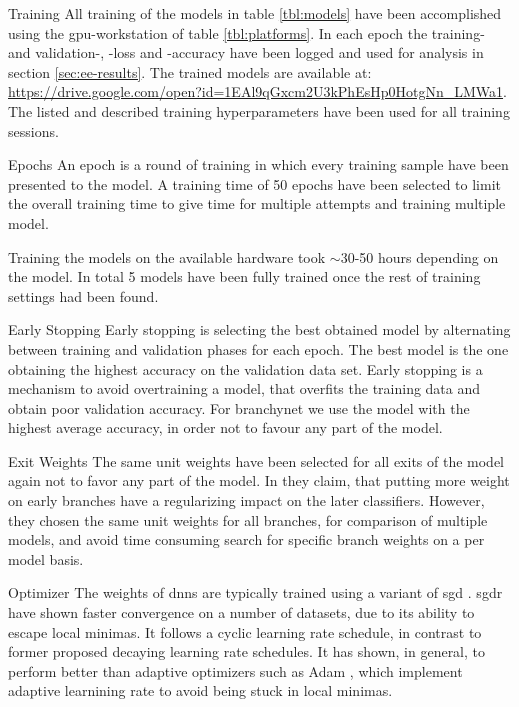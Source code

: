 \begin{enumdescript}
	\item[Training] All training of the models in table \ref{tbl:models} have been accomplished using the \gls{gpu}-workstation of table \ref{tbl:platforms}. In each epoch the training- and validation-, -loss and -accuracy have been logged and used for analysis in section \ref{sec:ee-results}. The trained models are available at: {\color{sns-grey}\url{https://drive.google.com/open?id=1EAl9qGxcm2U3kPhEsHp0HotgNn_LMWa1}}.
	The listed and described training hyperparameters have been used for all training sessions. 
	
	\begin{enumdescript}
		\item[Epochs] An epoch is a round of training in which every training sample have been presented to the model. A training time of 50 epochs have been selected to limit the overall training time to give time for multiple attempts and training multiple model.
		
		Training the models on the available hardware took $\sim$30-50 hours depending on the model. In total 5 models have been fully trained once the rest of training settings had been found.
		
		\item[Early Stopping] Early stopping is selecting the best obtained model by alternating between training and validation phases for each epoch. The best model is the one obtaining the highest accuracy on the validation data set. Early stopping is a mechanism to avoid overtraining a model, that overfits the training data and obtain poor validation accuracy. For \gls{branchynet} we use the model with the highest average accuracy, in order not to favour any part of the model.  
		
		\item[Exit Weights] The same unit weights have been selected for all exits of the model again not to favor any part of the model. In \cite{teerapittayanon_branchynet:_2016} they claim, that putting more weight on early branches have a regularizing impact on the later classifiers. However, they chosen the same unit weights for all branches, for comparison of multiple models, and avoid time consuming search for specific branch weights on a per model basis.
		
		\item[Optimizer] The weights of \gls{dnn}s are typically trained using a variant of \gls{sgd} \cite{goodfellow_deep_2016}. \gls{sgdr} \cite{loshchilov_sgdr:_2016} have shown faster convergence on a number of datasets, due to its ability to escape local minimas. It follows a cyclic learning rate schedule, in contrast to former proposed decaying learning rate schedules. It has shown, in general, to perform better than adaptive optimizers such as Adam \cite{kingma_adam:_2014}, which implement adaptive learnining rate to avoid being stuck in local minimas. 
		

\end{enumdescript}
\end{enumdescript}

